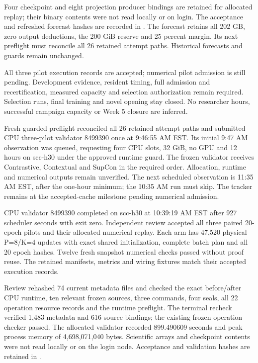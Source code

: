 Four checkpoint and eight projection producer bindings are retained for
allocated replay; their binary contents were not read locally or on login.
The acceptance and refreshed forecast hashes are recorded in
. The forecast retains all 202 GB,
zero output deductions, the 200 GiB reserve and 25 percent margin. Its next
preflight must reconcile all 26 retained attempt paths. Historical forecasts
and guards remain unchanged.

All three pilot execution records are accepted; numerical pilot admission is
still pending. Development evidence, resident timing, full admission and
recertification, measured capacity and selection authorization remain required.
Selection runs, final training and novel opening stay closed. No researcher
hours, successful campaign capacity or Week 5 closure are inferred.

Fresh guarded preflight reconciled all 26 retained attempt paths and submitted
CPU three-pilot validator 8499390 once at 9:46:55 AM EST. Its initial 9:47 AM
observation was queued, requesting four CPU slots, 32 GiB, no GPU and 12 hours
on scc-h30 under the approved runtime guard. The frozen validator receives
Contrastive, Contextual and SupCon in the required order. Allocation, runtime
and numerical outputs remain unverified. The next scheduled observation is
11:35 AM EST, after the one-hour minimum; the 10:35 AM run must skip.
The tracker remains at the accepted-cache milestone pending numerical admission.


CPU validator 8499390 completed on scc-h30 at 10:39:19 AM EST after 927
scheduler seconds with exit zero. Independent review accepted all three paired
20-epoch pilots and their allocated numerical replay. Each arm has 47,520
physical P=8/K=4 updates with exact shared initialization, complete batch plan
and all 20 epoch hashes. Twelve fresh snapshot numerical checks passed without
proof reuse. The retained manifests, metrics and wiring fixtures match their
accepted execution records.

Review rehashed 74 current metadata files and checked the exact before/after
CPU runtime, ten relevant frozen sources, three commands, four seals, all 22
operation resource records and the runtime preflight. The terminal recheck
verified 1,483 metadata and 616 source bindings; the existing frozen operation
checker passed. The allocated validator recorded 899.490609 seconds and peak
process memory of 4,698,071,040 bytes. Scientific arrays and checkpoint contents
were not read locally or on the login node. Acceptance and validation hashes
are retained in .

